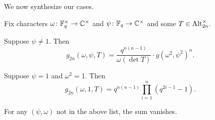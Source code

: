 We now synthesize our cases.
\begin{theorem} \label{thm:gsum-alt}
    Fix characters $\omega\colon\mathbb F_q^\times\to\mathbb C^\times$ and $\psi\colon\mathbb F_q\to\mathbb C^\times$ and some $T\in\operatorname{Alt}_{2n}^\times$.
    \begin{listalph}
        \item Suppose $\psi\ne1$. Then
        \[g_{2n}(\omega,\psi,T)=\frac{q^{n(n-1)}}{\omega(\det T)}\cdot g\left(\omega^2,\psi^2\right)^n.\]
        \item Suppose $\psi=1$ and $\omega^2=1$. Then
        \[g_{2n}(\omega,1,T)=q^{n(n-1)}\prod_{i=1}^{n}\left(q^{2i-1}-1\right).\]
    \end{listalph}
    For any $(\psi,\omega)$ not in the above list, the sum vanishes.
\end{theorem}
